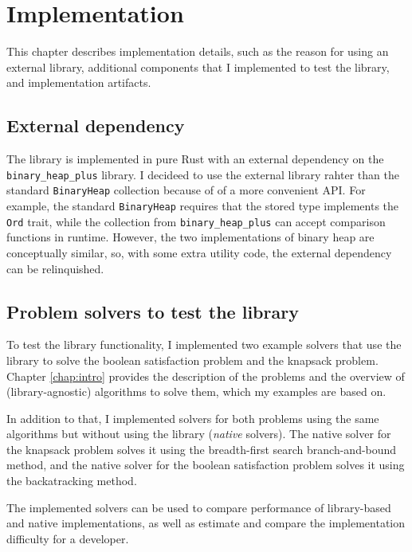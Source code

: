 \chapter{Implementation}
\label{chap:impl}

This chapter describes implementation details, such as the reason for using an external library,
additional components that I implemented to test the library, and implementation artifacts.

\section{External dependency}

The library is implemented in pure Rust with an external dependency on the
\texttt{binary\_heap\_plus} library. I decideed to use the external library rahter than the
standard \texttt{BinaryHeap} collection because of of a more convenient API. For example,
the standard \texttt{BinaryHeap} requires that the stored type implements the \texttt{Ord}
trait, while the collection from \texttt{binary\_heap\_plus} can accept comparison functions in
runtime. However, the two implementations of binary heap are conceptually similar, so, with some
extra utility code, the external dependency can be relinquished.

\section{Problem solvers to test the library}

To test the library functionality, I implemented two example solvers that use the library to
solve the boolean satisfaction problem and the knapsack problem. Chapter \ref{chap:intro}
provides the description of the problems and the overview of (library-agnostic)
algorithms to solve them, which my examples are based on.

In addition to that, I implemented solvers for both problems using the same algorithms
but without using the library (\emph{native} solvers).
The native solver for the knapsack problem solves it using the breadth-first search
branch-and-bound method, and the native solver for the boolean satisfaction problem solves it
using the backatracking method.

The implemented solvers can be used to compare performance of library-based and native
implementations, as well as estimate and compare the implementation difficulty for a developer.
